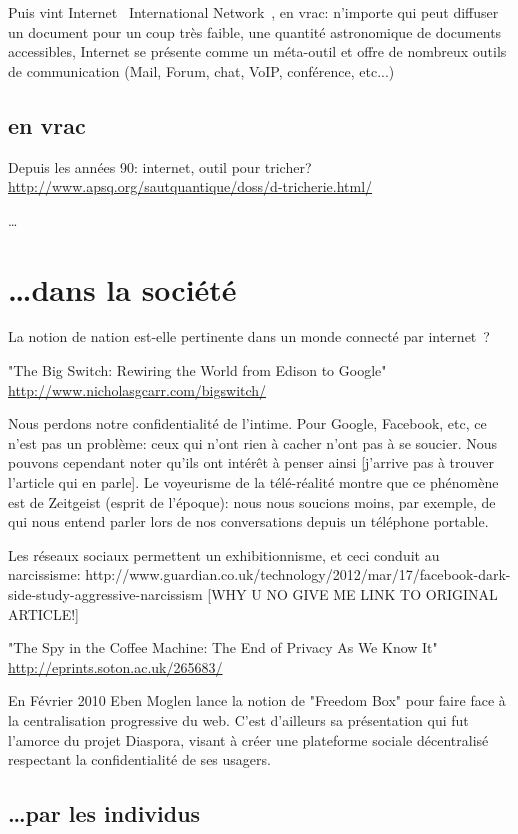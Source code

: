 Puis vint Internet \og{}~International Network~\fg{}, en vrac: n'importe qui
peut diffuser un document pour un coup très faible, une quantité astronomique
de documents accessibles, Internet se présente comme un méta-outil et offre de
nombreux outils de communication (Mail, Forum, chat, VoIP, conférence, etc...)

\section{en vrac}



Depuis les années 90: internet, outil pour tricher?
\url{http://www.apsq.org/sautquantique/doss/d-tricherie.html/}

\ldots

\chapter{\ldots dans la société}

La notion de nation est-elle pertinente dans un monde connecté par
internet~?

"The Big Switch: Rewiring the World from Edison to Google" 
 \url{http://www.nicholasgcarr.com/bigswitch/}

Nous perdons notre confidentialité de l'intime. Pour Google, Facebook, etc, 
ce n'est pas un problème: ceux qui n'ont rien à cacher n'ont pas à se soucier. Nous
pouvons cependant noter qu'ils ont intérêt à penser ainsi [j'arrive pas à 
trouver l'article qui en parle]. Le voyeurisme de la télé-réalité montre 
que ce phénomène est de Zeitgeist (esprit de l'époque): nous nous soucions 
moins, par exemple, de qui nous entend parler lors de nos
conversations depuis un téléphone portable.

Les réseaux sociaux permettent un exhibitionnisme, et ceci conduit au 
narcissisme:
http://www.guardian.co.uk/technology/2012/mar/17/facebook-dark-side-study-aggressive-narcissism 
[WHY U NO GIVE ME LINK TO ORIGINAL ARTICLE!]

"The Spy in the Coffee Machine: The End of Privacy As We Know It"
 \url{http://eprints.soton.ac.uk/265683/}

En Février 2010 Eben Moglen lance la notion de "Freedom Box" pour faire face à
la centralisation progressive du web. C'est d'ailleurs sa présentation qui fut
l'amorce du projet Diaspora, visant à créer une plateforme sociale décentralisé 
respectant la confidentialité de ses usagers. 

\section{\ldots par les individus}


